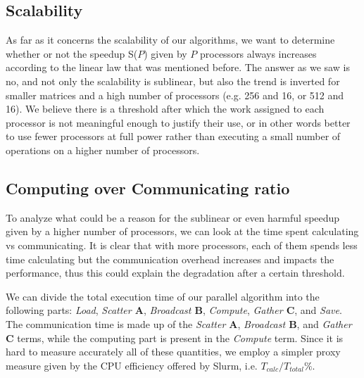 \documentclass[11pt]{article}
\begin{document}
\subsection{Scalability}
As far as it concerns the scalability of our algorithms, we want to determine whether or not the speedup S($P$) given by $P$ processors always increases according to the linear law that was mentioned before.
The answer as we saw is no, and not only the scalability is sublinear, but also the trend is inverted for smaller matrices and a high number of processors (e.g. 256 and 16, or 512 and 16). We believe there is a threshold after which the work assigned to each processor is not meaningful enough to justify their use, or in other words better to use fewer processors at full power rather than executing a small number of operations on a higher number of processors.


\subsection{Computing over Communicating ratio}\label{commratio}
To analyze what could be a reason for the sublinear or even harmful speedup given by a higher number of processors, we can look at the time spent calculating vs communicating. It is clear that with more processors, each of them spends less time calculating but the communication overhead increases and impacts the performance, thus this could explain the degradation after a certain threshold.

We can divide the total execution time of our parallel algorithm into the following parts: \textit{Load}, \textit{Scatter $\mathbf{A}$}, \textit{Broadcast $\mathbf{B}$}, \textit{Compute}, \textit{Gather $\mathbf{C}$}, and \textit{Save}.
The communication time is made up of the \textit{Scatter $\mathbf{A}$}, \textit{Broadcast $\mathbf{B}$}, and \textit{Gather $\mathbf{C}$} terms, while the computing part is present in the \textit{Compute} term.
Since it is hard to measure accurately all of these quantities, we employ a simpler proxy measure given by the CPU efficiency offered by Slurm, i.e. $T_{calc}/T_{total} \%$.
\end{document}
